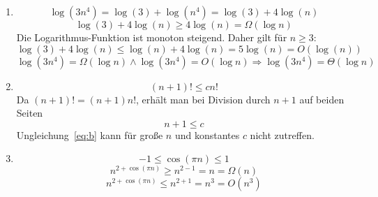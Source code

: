 \documentclass[11pt,a4paper]{article}
\begin{document}
\begin{loesung}
\begin{enumerate}
    \item
    \begin{equation}
        \log(3n^4) = \log(3) + \log(n^4) = \log(3) + 4\log(n)
    \end{equation}
    \begin{equation}
        \log(3) + 4\log(n)\geq 4\log(n) = \Omega(\log n) 
    \end{equation}
    Die Logarithmus-Funktion ist monoton steigend. Daher gilt für $n \geq 3$:
    \begin{equation}
        \log(3) + 4\log(n) \leq \log(n) + 4\log(n) = 5 \log(n) = O(\log(n)) 
    \end{equation}
    \begin{equation}
        \log(3n^4) = \Omega(\log n) \wedge \log(3n^4) = O(\log n) \Rightarrow \log(3n^4) = \Theta(\log n)
    \end{equation}
    
    \item
    \begin{equation}
        (n + 1)! \leq c n!
    \end{equation}
    Da $(n + 1)! = (n + 1)n!$, erhält man bei Division durch $n+1$ auf beiden Seiten
    \begin{equation}
        \label{eq:b}
        n + 1 \leq c
    \end{equation}
    Ungleichung~\ref{eq:b} kann für große $n$ und konstantes $c$ nicht zutreffen.
    



    \item
    \begin{equation}
        -1 \leq \cos(\pi n) \leq 1
    \end{equation}
    \begin{equation}
        n^{2 + \cos(\pi n)} \geq n^{2 - 1} = n = \Omega(n)
    \end{equation}
    \begin{equation}
        n^{2 + \cos(\pi n)} \leq n^{2 + 1} = n^3 = O(n^3)
    \end{equation}


\end{enumerate}
\end{loesung}
\end{document}
